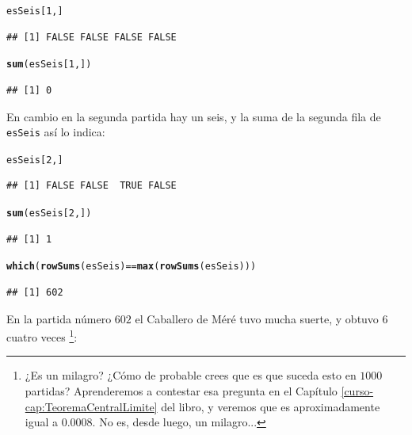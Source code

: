 \documentclass[10pt,a4paper]{article}\usepackage[]{graphicx}\usepackage[]{color}
\makeatletter
\newcommand{\hlnum}[1]{\textcolor[rgb]{0.686,0.059,0.569}{#1}}%
\newcommand{\hlopt}[1]{\textcolor[rgb]{0,0,0}{#1}}%
\newcommand{\hlstd}[1]{\textcolor[rgb]{0.345,0.345,0.345}{#1}}%
\newcommand{\hlkwd}[1]{\textcolor[rgb]{0.737,0.353,0.396}{\textbf{#1}}}%
\newenvironment{kframe}{%
 \def\at@end@of@kframe{}%
 \ifinner\ifhmode%
  \def\at@end@of@kframe{\end{minipage}}%
  \begin{minipage}{\columnwidth}%
 \fi\fi%
 \def\FrameCommand##1{\hskip\@totalleftmargin \hskip-\fboxsep
 \colorbox{shadecolor}{##1}\hskip-\fboxsep
     \hskip-\linewidth \hskip-\@totalleftmargin \hskip\columnwidth}%
 \MakeFramed {\advance\hsize-\width
   \@totalleftmargin\z@ \linewidth\hsize
   \@setminipage}}%
 {\par\unskip\endMakeFramed%
 \at@end@of@kframe}
\newenvironment{knitrout}{}{} %
\newcounter {cont01}
\makeatother
\begin{document}
\begin{knitrout}
\color{fgcolor}\begin{kframe}
\begin{alltt}
\hlstd{esSeis[}\hlnum{1}\hlstd{, ]}
\end{alltt}
\begin{verbatim}
## [1] FALSE FALSE FALSE FALSE
\end{verbatim}
\begin{alltt}
\hlkwd{sum}\hlstd{(esSeis[}\hlnum{1}\hlstd{, ])}
\end{alltt}
\begin{verbatim}
## [1] 0
\end{verbatim}
\end{kframe}
\end{knitrout}
En cambio en la segunda partida hay un seis, y la suma de la segunda fila de {\tt esSeis} así lo indica:
\begin{knitrout}
\color{fgcolor}\begin{kframe}
\begin{alltt}
\hlstd{esSeis[}\hlnum{2}\hlstd{, ]}
\end{alltt}
\begin{verbatim}
## [1] FALSE FALSE  TRUE FALSE
\end{verbatim}
\begin{alltt}
\hlkwd{sum}\hlstd{(esSeis[}\hlnum{2}\hlstd{, ])}
\end{alltt}
\begin{verbatim}
## [1] 1
\end{verbatim}
\begin{alltt}
\hlkwd{which}\hlstd{(}\hlkwd{rowSums}\hlstd{(esSeis)} \hlopt{==} \hlkwd{max}\hlstd{(}\hlkwd{rowSums}\hlstd{(esSeis)))}
\end{alltt}
\begin{verbatim}
## [1] 602
\end{verbatim}
\end{kframe}
\end{knitrout}
En la partida número $602$ el Caballero de Méré tuvo mucha suerte, y obtuvo $6$ cuatro veces \footnote{¿Es un milagro? ¿Cómo de probable crees que es que suceda esto en $1000$ partidas? Aprenderemos a contestar esa pregunta en el Capítulo \ref{curso-cap:TeoremaCentralLimite} del libro, y veremos que es aproximadamente igual a $0.0008$. No es, desde luego, un milagro...}:
\end{document}
